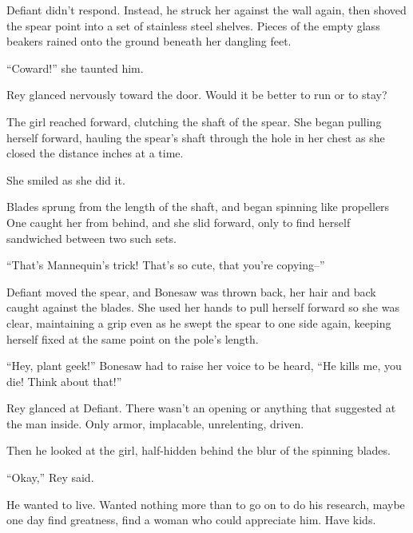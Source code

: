 Defiant didn't respond.  Instead, he struck her against the wall again, then shoved the spear point into a set of stainless steel shelves.  Pieces of the empty glass beakers rained onto the ground beneath her dangling feet.



``Coward!'' she taunted him.



Rey glanced nervously toward the door.  Would it be better to run or to stay?



The girl reached forward, clutching the shaft of the spear.  She began pulling herself forward, hauling the spear's shaft through the hole in her chest as she closed the distance inches at a time.



She smiled as she did it.



Blades sprung from the length of the shaft, and began spinning like propellers   One caught her from behind, and she slid forward, only to find herself sandwiched between two such sets.



``That's Mannequin's trick!  That's so cute, that you're copying--''



Defiant moved the spear, and Bonesaw was thrown back, her hair and back caught against the blades.  She used her hands to pull herself forward so she was clear, maintaining a grip even as he swept the spear to one side again, keeping herself fixed at the same point on the pole's length.



``Hey, plant geek!'' Bonesaw had to raise her voice to be heard, ``He kills me, you die!  Think about that!''



Rey glanced at Defiant.  There wasn't an opening or anything that suggested at the man inside.  Only armor, implacable, unrelenting, driven.



Then he looked at the girl, half-hidden behind the blur of the spinning blades.



``Okay,'' Rey said.



He wanted to live.  Wanted nothing more than to go on to do his research, maybe one day find greatness, find a woman who could appreciate him.  Have kids.



